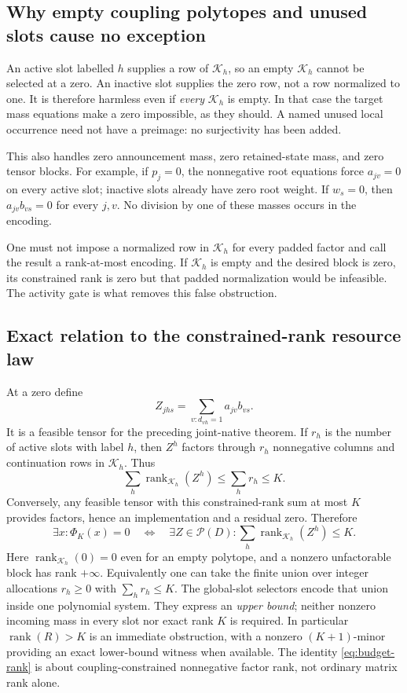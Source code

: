 \documentclass[11pt]{article}
\theoremstyle{remark}
\begin{document}
\subsection{Why empty coupling polytopes and unused slots cause no exception}
An active slot labelled $h$ supplies a row of $\mathcal K_h$, so an empty
$\mathcal K_h$ cannot be selected at a zero. An inactive slot supplies the
zero row, not a row normalized to one. It is therefore harmless even if
\emph{every} $\mathcal K_h$ is empty. In that case the target mass equations
make a zero impossible, as they should. A named unused local occurrence
need not have a preimage: no surjectivity has been added.

This also handles zero announcement mass, zero retained-state mass, and
zero tensor blocks. For example, if $p_j=0$, the nonnegative root equations
force $a_{jv}=0$ on every active slot; inactive slots already have zero root
weight. If $w_s=0$, then $a_{jv}b_{vs}=0$ for every $j,v$.
No division by one of these masses occurs in the encoding.

One must not impose a normalized row in $\mathcal K_h$ for every padded
factor and call the result a rank-at-most encoding. If $\mathcal K_h$ is
empty and the desired block is zero, its constrained rank is zero but that
padded normalization would be infeasible. The activity gate is what removes
this false obstruction.

\subsection{Exact relation to the constrained-rank resource law}
At a zero define
\[
 Z_{jhs}=\sum_{v:d_{vh}=1}a_{jv}b_{vs}.
\]
It is a feasible tensor for the preceding joint-native theorem. If $r_h$
is the number of active slots with label $h$, then
$Z^h$ factors through $r_h$ nonnegative columns and continuation rows in
$\mathcal K_h$. Thus
\[
 \sum_h\operatorname{rank}_{\mathcal K_h}(Z^h)\le\sum_hr_h\le K.
\]
Conversely, any feasible tensor with this constrained-rank sum at most $K$
provides factors, hence an implementation and a residual zero. Therefore
\begin{equation}\label{eq:budget-rank}
 \exists x:\Phi_K(x)=0
 \quad\Longleftrightarrow\quad
 \exists Z\in\mathcal P(D):
 \sum_h\operatorname{rank}_{\mathcal K_h}(Z^h)\le K.
\end{equation}
Here $\operatorname{rank}_{\mathcal K_h}(0)=0$ even for an empty polytope,
and a nonzero unfactorable block has rank $+\infty$.
Equivalently one can take the finite union over integer allocations
$r_h\ge0$ with $\sum_hr_h\le K$. The global-slot selectors encode that union
inside one polynomial system. They express an \emph{upper bound}; neither
nonzero incoming mass in every slot nor exact rank $K$ is required.
In particular $\operatorname{rank}(R)>K$ is an immediate obstruction, with
a nonzero $(K+1)$-minor providing an exact lower-bound witness when available.
The identity \eqref{eq:budget-rank} is about coupling-constrained
nonnegative factor rank, not ordinary matrix rank alone.
\end{document}
